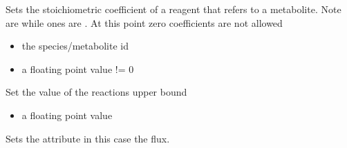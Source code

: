 \documentclass[letterpaper,10pt,english]{sphinxmanual}
\begin{document}
\begin{fulllineitems}
\begin{fulllineitems}
\label{\detokenize{modules_doc:cbmpy.CBModel.Reaction.setStoichCoefficient}}
\pysigstartsignatures
{}
\pysigstopsignatures
\sphinxAtStartPar
Sets the stoichiometric coefficient of a reagent that refers to a metabolite. Note  are 
while  ones are . At this point zero coefficients are not allowed
\begin{itemize}
\item {} 
\sphinxAtStartPar
{} the species/metabolite id

\item {} 
\sphinxAtStartPar
{} a floating point value != 0

\end{itemize}

\end{fulllineitems}


\begin{fulllineitems}
\label{\detokenize{modules_doc:cbmpy.CBModel.Reaction.setUpperBound}}
\pysigstartsignatures
{}
\pysigstopsignatures
\sphinxAtStartPar
Set the value of the reactions upper bound
\begin{itemize}
\item {} 
\sphinxAtStartPar
{} a floating point value

\end{itemize}

\end{fulllineitems}


\begin{fulllineitems}
\label{\detokenize{modules_doc:cbmpy.CBModel.Reaction.setValue}}
\pysigstartsignatures
{}
\pysigstopsignatures
\sphinxAtStartPar
Sets the attribute  in this case the flux.

\end{fulllineitems}


\end{fulllineitems}
\end{document}
